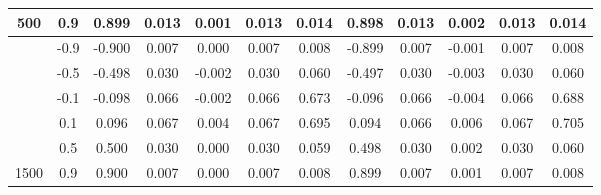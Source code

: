 \begin{table}[h]
{\begin{tabular}{|c|cccccc|ccccc|}
    \multirow{-6}{*}{500} & \multicolumn{1}{c|}{0.9} & \multicolumn{1}{c|}{0.899} & \multicolumn{1}{c|}{0.013} & \multicolumn{1}{c|}{0.001} & \multicolumn{1}{c|}{0.013} & 0.014 & \multicolumn{1}{c|}{0.898} & \multicolumn{1}{c|}{0.013} & \multicolumn{1}{c|}{0.002} & \multicolumn{1}{c|}{0.013} & 0.014 \\ \hline
     & \multicolumn{1}{c|}{-0.9} & \multicolumn{1}{c|}{-0.900} & \multicolumn{1}{c|}{0.007} & \multicolumn{1}{c|}{0.000} & \multicolumn{1}{c|}{0.007} & 0.008 & \multicolumn{1}{c|}{-0.899} & \multicolumn{1}{c|}{0.007} & \multicolumn{1}{c|}{-0.001} & \multicolumn{1}{c|}{0.007} & 0.008 \\ \cline{2-12} 
     & \multicolumn{1}{c|}{-0.5} & \multicolumn{1}{c|}{-0.498} & \multicolumn{1}{c|}{0.030} & \multicolumn{1}{c|}{-0.002} & \multicolumn{1}{c|}{0.030} & 0.060 & \multicolumn{1}{c|}{-0.497} & \multicolumn{1}{c|}{0.030} & \multicolumn{1}{c|}{-0.003} & \multicolumn{1}{c|}{0.030} & 0.060 \\ \cline{2-12} 
     & \multicolumn{1}{c|}{-0.1} & \multicolumn{1}{c|}{-0.098} & \multicolumn{1}{c|}{0.066} & \multicolumn{1}{c|}{-0.002} & \multicolumn{1}{c|}{0.066} & 0.673 & \multicolumn{1}{c|}{-0.096} & \multicolumn{1}{c|}{0.066} & \multicolumn{1}{c|}{-0.004} & \multicolumn{1}{c|}{0.066} & 0.688 \\ \cline{2-12} 
     & \multicolumn{1}{c|}{0.1} & \multicolumn{1}{c|}{0.096} & \multicolumn{1}{c|}{0.067} & \multicolumn{1}{c|}{0.004} & \multicolumn{1}{c|}{0.067} & 0.695 & \multicolumn{1}{c|}{0.094} & \multicolumn{1}{c|}{0.066} & \multicolumn{1}{c|}{0.006} & \multicolumn{1}{c|}{0.067} & 0.705 \\ \cline{2-12} 
     & \multicolumn{1}{c|}{0.5} & \multicolumn{1}{c|}{0.500} & \multicolumn{1}{c|}{0.030} & \multicolumn{1}{c|}{0.000} & \multicolumn{1}{c|}{0.030} & 0.059 & \multicolumn{1}{c|}{0.498} & \multicolumn{1}{c|}{0.030} & \multicolumn{1}{c|}{0.002} & \multicolumn{1}{c|}{0.030} & 0.060 \\ \cline{2-12} 
    \multirow{-6}{*}{1500} & \multicolumn{1}{c|}{0.9} & \multicolumn{1}{c|}{0.900} & \multicolumn{1}{c|}{0.007} & \multicolumn{1}{c|}{0.000} & \multicolumn{1}{c|}{0.007} & 0.008 & \multicolumn{1}{c|}{0.899} & \multicolumn{1}{c|}{0.007} & \multicolumn{1}{c|}{0.001} & \multicolumn{1}{c|}{0.007} & 0.008 \\ \hline
    \end{tabular}
    }
    \label{table:performance}
    \end{table}

\clearpage
\newpage
